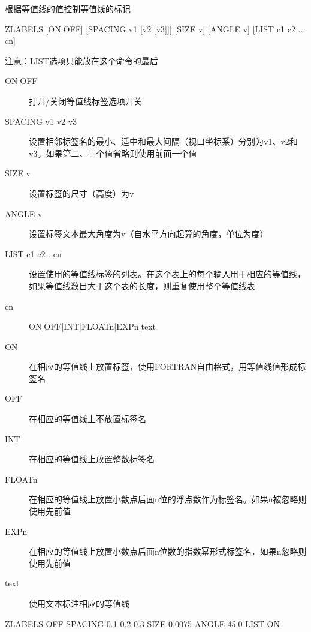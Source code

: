 \label{cmd:zlabels}

根据等值线的值控制等值线的标记

\begin{SACSTX}
ZLABELS [ON|OFF] [SPACING v1 [v2 [v3]]] [SIZE v]
    [ANGLE v] [LIST c1 c2 ... cn]
\end{SACSTX}
注意：LIST选项只能放在这个命令的最后

\begin{description}
\item [ON|OFF] 打开/关闭等值线标签选项开关
\item [SPACING v1 v2 v3] 设置相邻标签名的最小、适中和最大间隔（视口坐标系）分别为v1、v2和v3。如果第二、三个值省略则使用前面一个值
\item [SIZE v] 设置标签的尺寸（高度）为v
\item [ANGLE v] 设置标签文本最大角度为v（自水平方向起算的角度，单位为度）
\item [LIST c1 c2 . cn] 设置使用的等值线标签的列表。在这个表上的每个输入用于相应的等值线，如果等值线数目大于这个表的长度，则重复使用整个等值线表
\item [cn]  ON|OFF|INT|FLOATn|EXPn|text
\item [ON] 在相应的等值线上放置标签，使用FORTRAN自由格式，用等值线值形成标签名
\item [OFF] 在相应的等值线上不放置标签名
\item [INT] 在相应的等值线上放置整数标签名
\item [FLOATn] 在相应的等值线上放置小数点后面n位的浮点数作为标签名。如果n被忽略则使用先前值
\item [EXPn] 在相应的等值线上放置小数点后面n位数的指数幂形式标签名，如果n忽略则使用先前值
\item [text] 使用文本标注相应的等值线
\end{description}

\begin{SACDFT}
ZLABELS  OFF  SPACING 0.1 0.2 0.3  SIZE  0.0075 ANGLE 45.0  LIST ON
\end{SACDFT}

